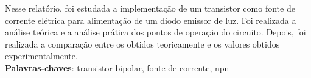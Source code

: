 \setlength{\absparsep}{18pt} %
 \begin{resumo}
Nesse relatório, foi estudada a implementação de um transistor como fonte de corrente elétrica para alimentação de um diodo emissor de luz. Foi realizada a análise teórica e a análise prática dos pontos de operação do circuito. Depois, foi realizada a comparação entre os obtidos teoricamente e os valores obtidos experimentalmente.\\
 \noindent
 \textbf{Palavras-chaves}: transistor bipolar, fonte de corrente, npn
\end{resumo} 